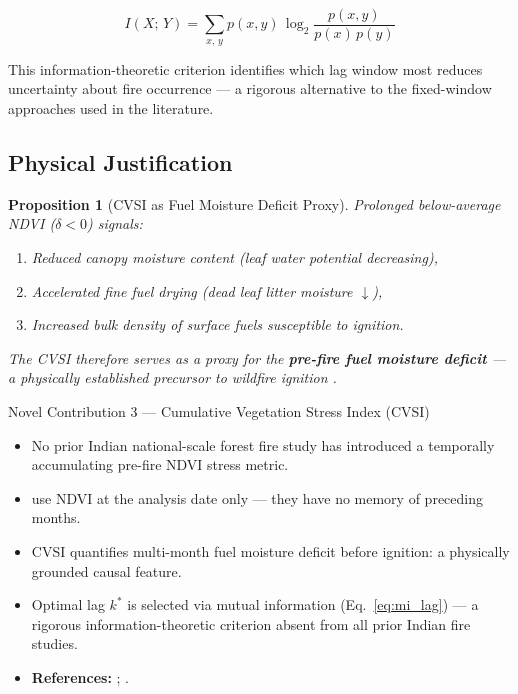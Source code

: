 \documentclass[12pt, a4paper]{article}
\newtheorem{proposition}{Proposition}[section]
\begin{document}
\begin{equation}
  I(X;\,Y) =
  \sum_{x,\,y}
  p(x,y)\,\log_{2}\!\frac{p(x,y)}{p(x)\,p(y)}
  \label{eq:mutual_info}
\end{equation}

This information-theoretic criterion identifies which lag window most
reduces uncertainty about fire occurrence --- a rigorous alternative
to the fixed-window approaches used in the literature.

\subsection{Physical Justification}

\begin{proposition}[CVSI as Fuel Moisture Deficit Proxy]
Prolonged below-average NDVI ($\delta < 0$) signals:
\begin{enumerate}[leftmargin=2em]
  \item Reduced canopy moisture content (leaf water potential decreasing),
  \item Accelerated fine fuel drying (dead leaf litter moisture $\downarrow$),
  \item Increased bulk density of surface fuels susceptible to ignition.
\end{enumerate}
The CVSI therefore serves as a proxy for the \textbf{pre-fire fuel
moisture deficit} --- a physically established precursor to wildfire
ignition \citep{chuvieco2004, flannigan2000}.
\end{proposition}

\begin{novelbox}{Novel Contribution 3 --- Cumulative Vegetation Stress Index (CVSI)}
\begin{itemize}[leftmargin=1.5em,itemsep=2pt]
  \item No prior Indian national-scale forest fire study has introduced
        a temporally accumulating pre-fire NDVI stress metric.
  \item \citet{biswas2025} use NDVI at the analysis date only ---
        they have no memory of preceding months.
  \item CVSI quantifies multi-month fuel moisture deficit before
        ignition: a physically grounded causal feature.
  \item Optimal lag $k^{*}$ is selected via mutual information
        (Eq.~\ref{eq:mi_lag}) --- a rigorous information-theoretic
        criterion absent from all prior Indian fire studies.
  \item \textbf{References:} \citet{chuvieco2004}; \citet{flannigan2000}.
\end{itemize}
\end{novelbox}
\end{document}
